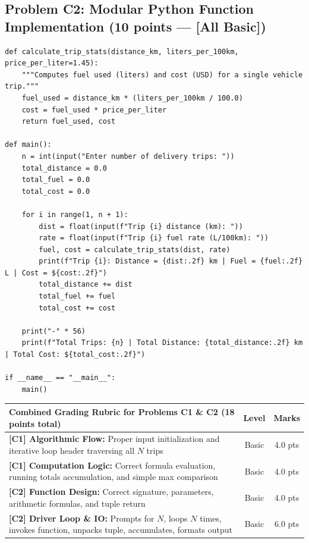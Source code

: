 \documentclass[11pt,a4paper]{article}
\begin{document}
\vspace{0.2mm}
\subsection*{Problem C2: Modular Python Function Implementation (10 points --- [All Basic])}

\begin{lstlisting}
def calculate_trip_stats(distance_km, liters_per_100km, price_per_liter=1.45):
    """Computes fuel used (liters) and cost (USD) for a single vehicle trip."""
    fuel_used = distance_km * (liters_per_100km / 100.0)
    cost = fuel_used * price_per_liter
    return fuel_used, cost

def main():
    n = int(input("Enter number of delivery trips: "))
    total_distance = 0.0
    total_fuel = 0.0
    total_cost = 0.0
    
    for i in range(1, n + 1):
        dist = float(input(f"Trip {i} distance (km): "))
        rate = float(input(f"Trip {i} fuel rate (L/100km): "))
        fuel, cost = calculate_trip_stats(dist, rate)
        print(f"Trip {i}: Distance = {dist:.2f} km | Fuel = {fuel:.2f} L | Cost = ${cost:.2f}")
        total_distance += dist
        total_fuel += fuel
        total_cost += cost
        
    print("-" * 56)
    print(f"Total Trips: {n} | Total Distance: {total_distance:.2f} km | Total Cost: ${total_cost:.2f}")

if __name__ == "__main__":
    main()
\end{lstlisting}

\begin{center}
\renewcommand{\arraystretch}{1.06}
\setlength{\tabcolsep}{3.5pt}
\begin{tabularx}{\textwidth}{|X|c|c|}
\hline
\textbf{Combined Grading Rubric for Problems C1 \& C2 (18 points total)} & \textbf{Level} & \textbf{Marks} \\
\hline
\textbf{[C1] Algorithmic Flow:} Proper input initialization and iterative loop header traversing all $N$ trips & Basic & 4.0 pts \\
\hline
\textbf{[C1] Computation Logic:} Correct formula evaluation, running totals accumulation, and simple max comparison & Basic & 4.0 pts \\
\hline
\hline
\textbf{[C2] Function Design:} Correct signature, parameters, arithmetic formulas, and tuple return & Basic & 4.0 pts \\
\hline
\textbf{[C2] Driver Loop \& IO:} Prompts for $N$, loops $N$ times, invokes function, unpacks tuple, accumulates, formats output & Basic & 6.0 pts \\
\hline
\end{tabularx}
\end{center}
\end{document}
